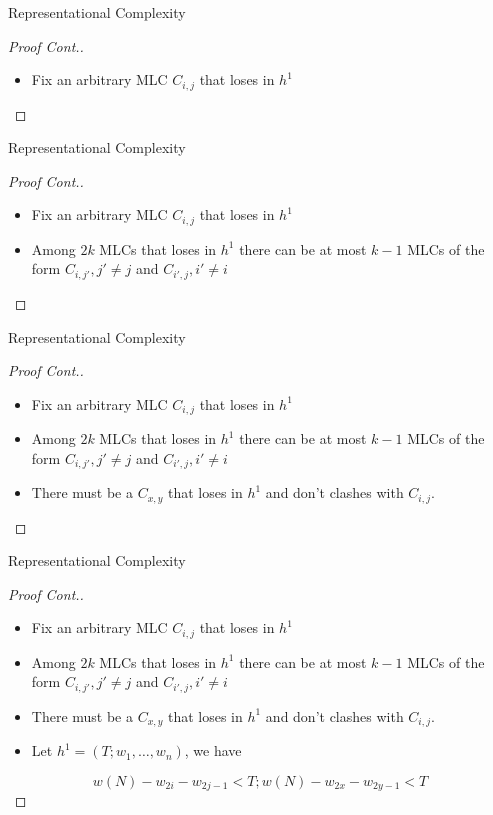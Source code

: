 \documentclass{beamer}
\begin{document}
\begin{frame}[fragile]{Representational Complexity}
  \begin{proof}[Proof Cont.]
    \begin{itemize}
      \item Fix an arbitrary MLC $C_{i,j}$ that loses in $h^1$
    \end{itemize}
  \end{proof}
\end{frame}


\begin{frame}[fragile]{Representational Complexity}
  \begin{proof}[Proof Cont.]
    \begin{itemize}
      \item Fix an arbitrary MLC $C_{i,j}$ that loses in $h^1$
      \item Among $2k$ MLCs that loses in $h^1$ there can be at most $k - 1$ MLCs of the form
      $C_{i,j'}, j' \neq j$ and $C_{i',j}, i' \neq i$
    \end{itemize}
\end{proof}
\end{frame}

\begin{frame}[fragile]{Representational Complexity}
  \begin{proof}[Proof Cont.]
    \begin{itemize}
      \item Fix an arbitrary MLC $C_{i,j}$ that loses in $h^1$
      \item Among $2k$ MLCs that loses in $h^1$ there can be at most $k - 1$ MLCs of the form
      $C_{i,j'}, j' \neq j$ and $C_{i',j}, i' \neq i$
      \item There must be a $C_{x,y}$ that loses in $h^1$ and don't clashes with $C_{i,j}$.
    \end{itemize}
\end{proof}
\end{frame}


\begin{frame}[fragile]{Representational Complexity}
  \begin{proof}[Proof Cont.]
    \begin{itemize}
      \item Fix an arbitrary MLC $C_{i,j}$ that loses in $h^1$
      \item Among $2k$ MLCs that loses in $h^1$ there can be at most $k - 1$ MLCs of the form
      $C_{i,j'}, j' \neq j$ and $C_{i',j}, i' \neq i$
      \item There must be a $C_{x,y}$ that loses in $h^1$ and don't clashes with $C_{i,j}$.
      \item Let $h^1 = (T; w_1, \dots, w_n)$, we have
    \end{itemize}
    \begin{equation}
      w(N) - w_{2i} - w_{2j - 1} < T; w(N) - w_{2x} - w_{2y - 1} < T\label{eq:2}
    \end{equation}
\end{proof}
\end{frame}
\end{document}
